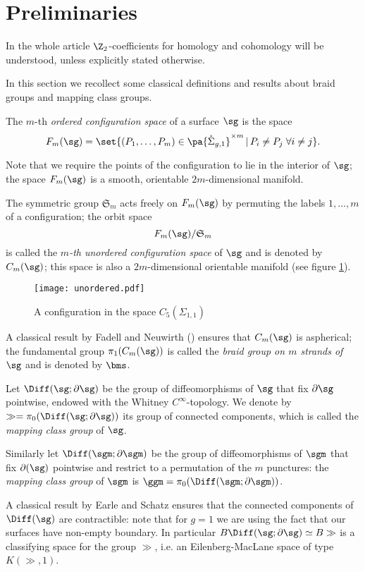 \section{Preliminaries}
\label{sec:Preliminaries}
In the whole article $\Z_2$-coefficients for homology and cohomology will be understood,
unless explicitly stated otherwise.

In this section we recollect some classical definitions and results about braid groups and mapping class groups.

\begin{defn}
\label{defn:cms}
 The $m$-th \emph{ordered configuration space} of a surface $\sg$ is the space
\[
 F_m(\sg)=\set{(P_1,\dots,P_m) \in \pa{\mathring{\Sigma}_{g,1}}^{\times m}  \,|\,  P_i\neq P_j  \;\forall i\neq j}.
\]

 Note that we require the points of the configuration to lie in the interior of $\sg$; the space
 $F_m(\sg)$ is a smooth, orientable $2m$-dimensional manifold.
 
 The symmetric group $\mathfrak{S}_m$ acts freely on $F_m(\sg)$ by permuting the labels $1,\dots,m$ of a configuration;
 the orbit space
 \[
 F_m(\sg)/\mathfrak{S}_m
 \]
 is called the \emph{$m$-th unordered configuration space}
 of $\sg$ and is denoted by $C_m(\sg)$; this space is also a $2m$-dimensional orientable manifold
 (see figure \ref{fig:unordered}).
 
\end{defn}

\begin{figure}\centering
\texttt{[image: unordered.pdf]}
\caption{A configuration in the space $C_5(\Sigma_{1,1})$}
\label{fig:unordered}
\end{figure}


A classical result by Fadell and Neuwirth (\cite{FadellNeuwirth}) ensures
that $C_m(\sg)$ is aspherical; the fundamental group $\pi_1(C_m(\sg))$ is
called the \emph{braid group on $m$ strands of $\sg$} and is denoted by $\bms$.

\begin{defn}
 \label{def:mcg}
 Let $\Diff(\sg;\partial\sg)$ be the group of diffeomorphisms of $\sg$ that fix $\partial\sg$ pointwise,
 endowed with the Whitney $C^{\infty}$-topology. We denote by $\gg=\pi_0(\Diff(\sg;\partial\sg))$ its group of connected
 components, which is called the \emph{mapping class group} of $\sg$.
 
 Similarly let $\Diff(\sgm;\partial\sgm)$ be the group of diffeomorphisms of $\sgm$ that fix $\partial(\sg)$
 pointwise and restrict to a permutation of the $m$ punctures: the \emph{mapping class group} of $\sgm$ is
 $\ggm=\pi_0(\Diff(\sgm;\partial\sgm))$.
 \end{defn}
 A classical result by Earle and Schatz \cite{EarleSchatz} ensures that the connected components
 of $\Diff(\sg)$ are contractible: note that for $g=1$ we are using the fact
 that our surfaces have non-empty boundary. In particular $B\Diff(\sg;\partial\sg)\simeq B\gg$ is
 a classifying space for
 the group $\gg$, i.e. an Eilenberg-MacLane space of type $K(\gg,1)$.
 
